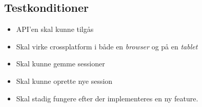 \subsection{Testkonditioner}

\begin{itemize}
\item API'en skal kunne tilgås
\item Skal virke crossplatform i både en \textit{browser} og på en \textit{tablet}
\item Skal kunne gemme sessioner
\item Skal kunne oprette nye session
\item Skal stadig fungere efter der implementeres en ny feature.
\end{itemize}